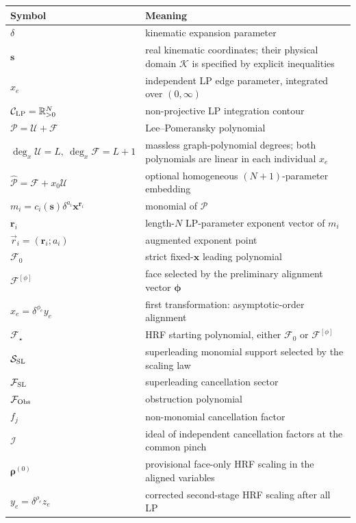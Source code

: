 \documentclass[a4paper,11pt]{article}
\newcommand{\x}{\boldsymbol{x}}
\newcommand{\s}{\boldsymbol{s}}
\newcommand{\K}{\mathcal K}
\newcommand{\FSL}{\mathcal F_{\rm SL}}
\newcommand{\SSL}{\mathcal S_{\rm SL}}
\newcommand{\FObs}{\mathcal F_{\rm Obs}}
\newcommand{\ideal}{\mathcal I}
\begin{document}
\begin{center}
\begin{tabular}{@{}p{}p{}@{}}
\toprule
Symbol & Meaning\\
\midrule
\(\delta\) & kinematic expansion parameter\\
\(\s\) & real kinematic coordinates; their physical domain \(\K\) is specified
  by explicit inequalities\\
\(x_e\) & independent LP edge parameter, integrated over \((0,\infty)\)\\
\(\mathcal C_{\rm LP}=\mathbb R_{>0}^{N}\) & non-projective LP integration
  contour\\
\(\mathcal P=\mathcal U+\mathcal F\) & Lee--Pomeransky polynomial\\
\(\deg_x\mathcal U=L,\ \deg_x\mathcal F=L+1\) & massless graph-polynomial
  degrees; both polynomials are linear in each individual \(x_e\)\\
\(\widehat{\mathcal P}=\mathcal F+x_0\mathcal U\) & optional homogeneous
  \((N+1)\)-parameter embedding\\
\(m_i=c_i(\s)\delta^{a_i}\x^{\boldsymbol r_i}\) & monomial of
  \(\mathcal P\)\\
\(\boldsymbol r_i\) & length-\(N\) LP-parameter exponent vector of \(m_i\)\\
\(\vec r_i=(\boldsymbol r_i;a_i)\) & augmented exponent point\\
\(\mathcal F_0\) & strict fixed-\(\x\) leading polynomial\\
\(\mathcal F^{[\phi]}\) & face selected by the preliminary alignment vector
  \(\boldsymbol\phi\)\\
\(x_e=\delta^{\phi_e}y_e\) & first transformation: asymptotic-order
  alignment\\
\(\mathcal F_\star\) & HRF starting polynomial, either
  \(\mathcal F_0\) or \(\mathcal F^{[\phi]}\)\\
\(\SSL\) & superleading monomial support selected by the scaling law\\
\(\FSL\) & superleading cancellation sector\\
\(\FObs\) & obstruction polynomial\\
\(f_j\) & non-monomial cancellation factor\\
\(\ideal\) & ideal of independent cancellation factors at the common pinch\\
\(\boldsymbol\rho^{(0)}\) & provisional face-only HRF scaling in the aligned
  variables\\
\(y_e=\delta^{\rho_e}z_e\) & corrected second-stage HRF scaling after all LP

\end{tabular}
\end{center}
\end{document}
